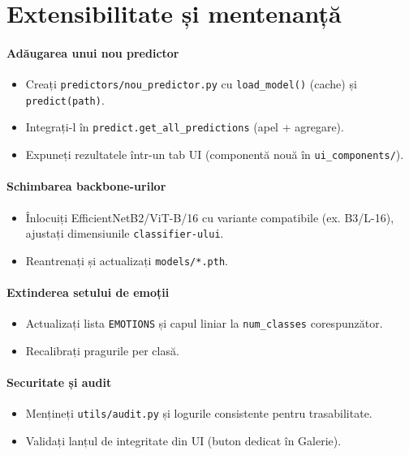 \section{Extensibilitate și mentenanță}\label{sec:maintenance}

\paragraph{Adăugarea unui nou predictor}
\begin{itemize}
  \item Creați \texttt{predictors/nou\_predictor.py} cu \texttt{load\_model()} (cache) și \texttt{predict(path)}.
  \item Integrați-l în \texttt{predict.get\_all\_predictions} (apel + agregare).
  \item Expuneți rezultatele într-un tab UI (componentă nouă în \texttt{ui\_components/}).
\end{itemize}

\paragraph{Schimbarea backbone-urilor}
\begin{itemize}
  \item Înlocuiți EfficientNetB2/ViT-B/16 cu variante compatibile (ex. B3/L-16), ajustați dimensiunile \texttt{classifier-ului}.
  \item Reantrenați și actualizați \texttt{models/*.pth}.
\end{itemize}

\paragraph{Extinderea setului de emoții}
\begin{itemize}
  \item Actualizați lista \texttt{EMOTIONS} și capul liniar la \texttt{num\_classes} corespunzător.
  \item Recalibrați pragurile per clasă.
\end{itemize}

\paragraph{Securitate și audit}
\begin{itemize}
  \item Mențineți \texttt{utils/audit.py} și logurile consistente pentru trasabilitate.
  \item Validați lanțul de integritate din UI (buton dedicat în Galerie).
\end{itemize}

